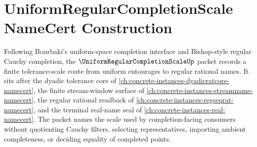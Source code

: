 \chapter{UniformRegularCompletionScale NameCert Construction}
\label{ch:concrete-instances-uniform-regular-completion-scale-namecert}

Following Bourbaki's uniform-space completion interface and Bishop-style regular Cauchy completion, the $\UniformRegularCompletionScaleUp$ packet records a finite tolerance-scale route from uniform entourages to regular rational names. It sits after the dyadic tolerance core of \autoref{ch:concrete-instances-dyadicratcore-namecert}, the finite stream-window surface of \autoref{ch:concrete-instances-streamname-namecert}, the regular rational readback of \autoref{ch:concrete-instances-regseqrat-namecert}, and the terminal real-name seal of \autoref{ch:concrete-instances-real-namecert}. The packet names the scale used by completion-facing consumers without quotienting Cauchy filters, selecting representatives, importing ambient completeness, or deciding equality of completed points.

